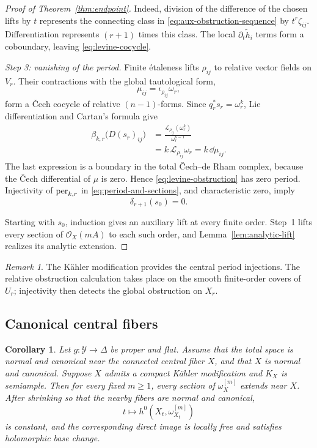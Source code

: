 \documentclass[11pt,a4paper]{article}
\numberwithin{equation}{section}
\newtheorem{corollary}[theorem]{Corollary}
\theoremstyle{definition}
\theoremstyle{remark}
\newtheorem{remark}[theorem]{Remark}
\newcommand{\OO}{\mathcal O}\newcommand{\cX}{\mathcal X}
\begin{document}
\begin{proof}[Proof of Theorem~\ref{thm:endpoint}]
Indeed, division of the difference of the chosen lifts by $t$ represents
the connecting class in \eqref{eq:aux-obstruction-sequence} by
$t^r\zeta_{ij}$. Differentiation represents $(r+1)$ times this class.
The local $\partial_t\widetilde h_i$ terms form a coboundary, leaving
\eqref{eq:levine-cocycle}.

\smallskip\noindent\emph{Step 3: vanishing of the period.}
Finite étaleness lifts $\rho_{ij}$ to relative vector fields on $V_r$.
Their contractions with the global tautological form,
\[
 \mu_{ij}=\iota_{\rho_{ij}}\omega_r,
\]
form a Čech cocycle of relative $(n-1)$-forms. Since
$q_r^*s_r=\omega_r^k$, Lie differentiation and Cartan's formula give
\begin{equation}\label{eq:exact-obstruction}
\begin{aligned}
 \beta_{k,r}\bigl(D(s_r)_{ij}\bigr)
 &=\frac{\mathcal L_{\rho_{ij}}(\omega_r^k)}{\omega_r^{k-1}}\\
 &=k\,\mathcal L_{\rho_{ij}}\omega_r
 =k\,\dd\mu_{ij}.
\end{aligned}
\end{equation}
The last expression is a boundary in the total Čech--de Rham complex,
because the Čech differential of $\mu$ is zero. Hence
\eqref{eq:levine-obstruction} has zero period. Injectivity of
$\operatorname{per}_{k,r}$ in \eqref{eq:period-and-sections}, and characteristic
zero, imply
\begin{equation}\label{eq:aux-obstruction-zero}
 \delta_{r+1}(s_0)=0.
\end{equation}

Starting with $s_0$, induction gives an auxiliary lift at every finite
order. Step~1 lifts every section of $\OO_X(mA)$ to each such order,
and Lemma~\ref{lem:analytic-lift} realizes its analytic extension.
\end{proof}

\begin{remark}\label{rem:scope-endpoint}
The Kähler modification provides the central period injections.
The relative obstruction calculation takes place on the smooth
finite-order covers of $U_r$; injectivity then detects the global
obstruction on $X_r$.
\end{remark}

\subsection{Canonical central fibers}

\begin{corollary}\label{cor:canonical-endpoint}
Let $g:\mathcal Y\to\Delta$ be proper and flat. Assume that the total
space is normal and canonical near the connected central fiber $X$,
and that $X$ is normal and canonical. Suppose $X$ admits a compact
Kähler modification and $K_X$ is semiample. Then for every fixed
$m\ge1$, every section of $\omega_X^{[m]}$ extends near $X$.
After shrinking so that the nearby fibers are normal and canonical,
\[
 t\longmapsto h^0(X_t,\omega_{X_t}^{[m]})
\]
is constant, and the corresponding direct image is locally free and
satisfies holomorphic base change.
\end{corollary}
\end{document}
